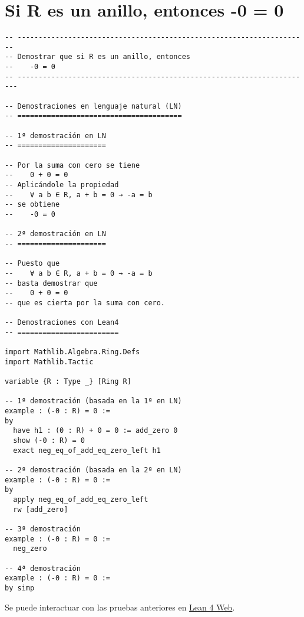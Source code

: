\section{Si R es un anillo, entonces -0 = 0}
\label{sec:orgb98a613}
\begin{verbatim}
-- ---------------------------------------------------------------------
-- Demostrar que si R es un anillo, entonces
--    -0 = 0
-- ----------------------------------------------------------------------

-- Demostraciones en lenguaje natural (LN)
-- =======================================

-- 1ª demostración en LN
-- =====================

-- Por la suma con cero se tiene
--    0 + 0 = 0
-- Aplicándole la propiedad
--    ∀ a b ∈ R, a + b = 0 → -a = b
-- se obtiene
--    -0 = 0

-- 2ª demostración en LN
-- =====================

-- Puesto que
--    ∀ a b ∈ R, a + b = 0 → -a = b
-- basta demostrar que
--    0 + 0 = 0
-- que es cierta por la suma con cero.

-- Demostraciones con Lean4
-- ========================

import Mathlib.Algebra.Ring.Defs
import Mathlib.Tactic

variable {R : Type _} [Ring R]

-- 1ª demostración (basada en la 1ª en LN)
example : (-0 : R) = 0 :=
by
  have h1 : (0 : R) + 0 = 0 := add_zero 0
  show (-0 : R) = 0
  exact neg_eq_of_add_eq_zero_left h1

-- 2ª demostración (basada en la 2ª en LN)
example : (-0 : R) = 0 :=
by
  apply neg_eq_of_add_eq_zero_left
  rw [add_zero]

-- 3ª demostración
example : (-0 : R) = 0 :=
  neg_zero

-- 4ª demostración
example : (-0 : R) = 0 :=
by simp
\end{verbatim}
Se puede interactuar con las pruebas anteriores en \href{https://lean.math.hhu.de/\#url=https://raw.githubusercontent.com/jaalonso/Calculemus2/main/src/Opuesto\_del\_cero.lean}{Lean 4 Web}.

